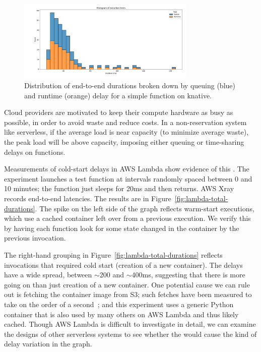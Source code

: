 \begin{figure}[t!]
    \centering
      \includegraphics[width=8.5cm]{img/knative_stacked.png}
      \caption{Distribution of end-to-end durations broken down by
        queuing (blue) and runtime (orange) delay for a simple function on
        knative.}
    \label{fig:knative}
\end{figure}

Cloud providers are motivated to keep their compute hardware as busy
as possible, in order to avoid waste and reduce costs. In a
non-reservation system like serverless, if the average load is near
capacity (to minimize average waste), the peak load will be above
capacity, imposing either queuing or time-sharing delays on functions.


Measurements of cold-start delays in AWS Lambda show evidence
of
this \problem{}.
The experiment launches a test function at intervals randomly
spaced between 0 and 10 minutes; the function
just sleeps for 20ms and then returns. AWS Xray~\cite{aws-xray}
records end-to-end latencies.
The results are in Figure~\ref{fig:lambda-total-durations}. The spike
on the left side of the graph reflects warm-start executions,
which use a cached container left over from a previous execution.
We verify this by having each function look for some state changed
in the container by the previous invocation.

The right-hand grouping in Figure~\ref{fig:lambda-total-durations}
reflects invocations that required cold start (creation of a new
container). The delays have a wide spread, between $\sim$200 and
$\sim$400ms, suggesting that there is more going on than just creation
of a new container. One potential cause we can rule out is fetching
the container image from S3; such fetches have been measured to take
on the order of a second~\cite{sigmaos}; and this experiment uses a
generic Python container that is also used by many others on AWS
Lambda and thus likely cached. Though AWS Lambda is difficult to
investigate in detail, we can examine the designs of other serverless
systems to see whether the {\problem} would cause the kind of delay
variation in the graph.

